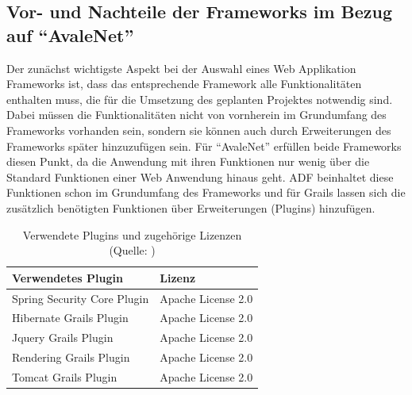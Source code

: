 \subsection{Vor- und Nachteile der Frameworks im Bezug auf "`AvaleNet"'}
Der zunächst wichtigste Aspekt bei der Auswahl eines Web Applikation Frameworks ist, dass das entsprechende Framework alle Funktionalitäten enthalten muss, die für die Umsetzung des geplanten Projektes notwendig sind. Dabei müssen die Funktionalitäten nicht von vornherein im Grundumfang des Frameworks vorhanden sein, sondern sie können auch durch Erweiterungen des Frameworks später hinzuzufügen sein. Für "`AvaleNet"' erfüllen beide Frameworks diesen Punkt, da die Anwendung mit ihren Funktionen nur wenig über die Standard Funktionen einer Web Anwendung hinaus geht. ADF beinhaltet diese Funktionen schon im Grundumfang des Frameworks und für Grails lassen sich die zusätzlich benötigten Funktionen über Erweiterungen (Plugins) hinzufügen. \begin{table}[h]
  \centering
    \begin{tabular}{l l}
	  \toprule
	  Verwendetes Plugin & Lizenz \\
	  \midrule
	  Spring Security Core Plugin &  Apache License 2.0 \\
	  Hibernate Grails Plugin &  Apache License 2.0  \\
	  Jquery Grails Plugin &  Apache License 2.0  \\
	  Rendering Grails Plugin &  Apache License 2.0  \\
	  Tomcat Grails Plugin &  Apache License 2.0  \\
	  \bottomrule
    \end{tabular}
    \caption{Verwendete Plugins und zugehörige Lizenzen (Quelle: \GrailsPlugins)}

\end{table}
